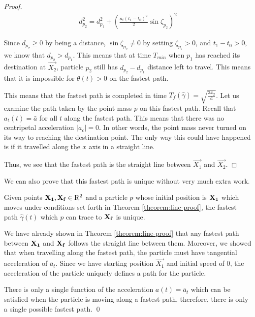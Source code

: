 \begin{proof}
\begin{eqnarray}
d_{p_2}^2 = d_{p_1}^2 + \left(\frac{\bar{a}_t (t_1 - t_0)^2}{2} \sin \zeta_{p_2} \right)^2
\end{eqnarray}

Since $d_{p_2} \geq 0$ by being a distance, $\sin \zeta_{p_2} \neq 0$ by setting $\zeta_{p_2} > 0$, and $t_1 - t_0 > 0$, we know that $d_{p_2} > d_{p_1}$. This means that at time $T_{min}$ when $p_1$ has reached its destination at $\Vec{X_2}$, particle $p_2$ still has $d_{p_2} - d_{p_1}$ distance left to travel. This means that it is impossible for $\theta(t) > 0$ on the fastest path.

This means that the fastest path is completed in time $T_f(\hat{\gamma}) = \sqrt{\frac{2 x_2}{\bar{a}}}$. Let us examine the path taken by the point mass $p$ on this fastest path. Recall that $a_t(t) = \bar{a}$ for all $t$ along the fastest path. This means that there was no centripetal acceleration $|a_c| = 0$. In other words, the point mass never turned on its way to reaching the destination point. The only way this could have happened is if it travelled along the $x$ axis in a straight line.

Thus, we see that the fastest path is the straight line between $\vec{X_1}$ and $\vec{X_2}$.
\end{proof}

We can also prove that this fastest path is unique without very much extra work.

\begin{corollary}
  Given points $\mathbf{X_1}, \mathbf{X_f} \in \mathrm{R}^2$ and a particle $p$ whose initial position is $\mathbf{X_1}$ which moves under conditions set forth in Theorem \ref{theorem:line-proof}, the fastest path $\hat{\gamma}(t)$ which $p$ can trace to $\mathbf{X_f}$ is unique.
\end{corollary}
\proof We have already shown in Theorem \ref{theorem:line-proof} that any fastest path between $\mathbf{X_1}$ and $\mathbf{X_f}$ follows the straight line between them. Moreover, we showed that when travelling along the fastest path, the particle must have tangential acceleration of $\bar{a}_t$. Since we have starting position $\vec{X_1}$ and initial speed of $0$, the acceleration of the particle uniquely defines a path for the particle.

There is only a single function of the acceleration $a(t) = \bar{a}_t$ which can be satisfied when the particle is moving along a fastest path, therefore, there is only a single possible fastest path.
\qed

